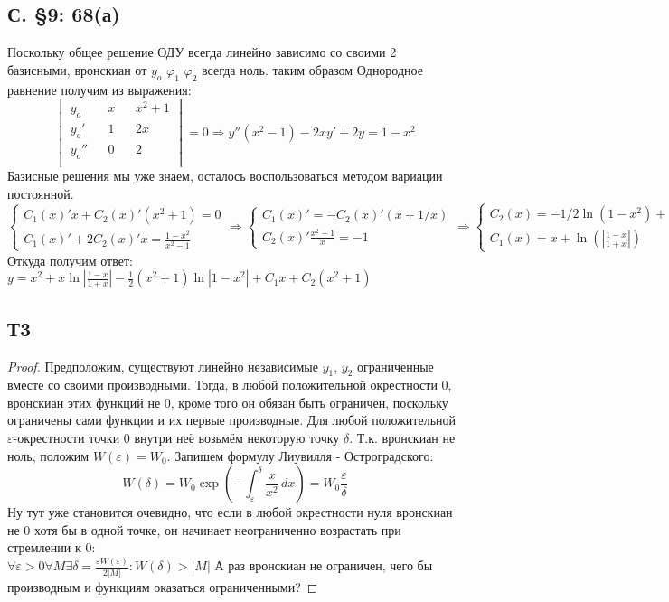 \documentclass{article}
\begin{document}
\subsection{С. \S9: 68(а)}
Поскольку общее решение ОДУ всегда линейно зависимо со своими 2 базисными, вронскиан от $y_o$ $\varphi_1$ $\varphi_2$ всегда ноль. таким образом Однородное равнение получим из выражения:
\begin{equation}
\begin{vmatrix}
y_o  && x && x^2+1 \\
y_o' && 1 && 2x \\
y_o'' && 0 && 2 \\
\end{vmatrix}
=0    \Rightarrow
y''(x^2-1) - 2x y' + 2y = 1-x^2
\end{equation}
Базисные решения мы уже знаем, осталось воспользоваться методом вариации постоянной.
\begin{equation}
    \begin{cases}
        C_1(x)'x+C_2(x)'(x^2+1)=0 \\
        C_1(x)'+ 2C_2(x)'x=\frac{1-x^2}{x^2-1}
    \end{cases}
    \Rightarrow
    \begin{cases}
        C_1(x)'=-C_2(x)'(x+1/x) \\
        C_2(x)' \frac{x^2-1}{x}=-1
    \end{cases}
    \Rightarrow
    \begin{cases}
    C_2(x)=-1/2 \ln (1-x^2) + C_2\\
    C_1(x)=x+\ln(|\frac{1-x}{1+x}|)
    \end{cases}
\end{equation}
Откуда получим ответ: $y=x^2 + x\ln|\frac{1-x}{1+x}| - \frac{1}{2} (x^2+1) \ln|1-x^2|  +  C_1 x + C_2 (x^2+1)$

\subsection{Т3} 
\begin{proof}
Предположим, существуют линейно независимые $y_1$, $y_2$ ограниченные вместе со своими производными. Тогда, в любой положительной окрестности 0, вронскиан этих функций не 0, кроме того он обязан быть ограничен, поскольку ограничены сами функции и их первые производные. Для любой положительной $\varepsilon$-окрестности точки 0 внутри неё возьмём некоторую точку $\delta$. Т.к. вронскиан не ноль, положим $W(\varepsilon)=W_0$. Запишем формулу Лиувилля - Остроградского:
\begin{equation}
    W(\delta)=W_0 \exp \left(- \int^{\delta}_{\varepsilon} \frac{x}{x^2} \, dx  \right) = W_0 \frac{\varepsilon}{\delta}
\end{equation}
Ну тут уже становится очевидно, что если в любой окрестности нуля вронскиан не 0 хотя бы в одной точке, он начинает неограниченно возрастать при стремлении к 0:\\
$\forall  \varepsilon > 0 \forall M \exists \delta =  \frac{\varepsilon W(\varepsilon)}{2|M|}: W(\delta)>|M|$
А раз вронскиан не ограничен, чего бы производным и функциям оказаться ограниченными?
\end{proof}
\end{document}

